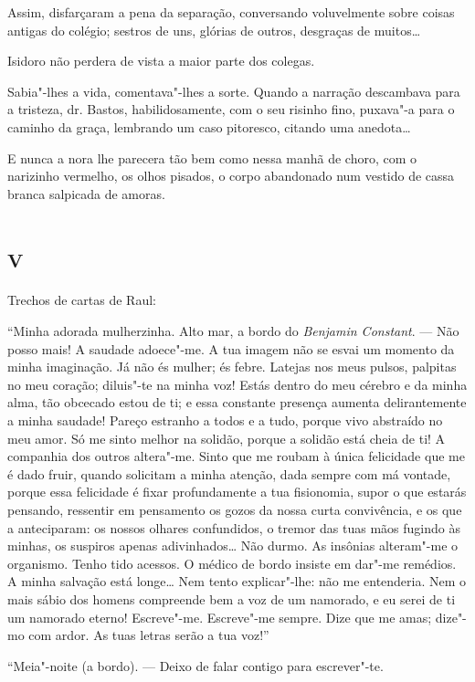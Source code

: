 Assim, disfarçaram a pena da separação, conversando voluvelmente sobre
coisas antigas do colégio; sestros de uns, glórias de outros, desgraças
de muitos\ldots{}

Isidoro não perdera de vista a maior parte dos colegas.

Sabia"-lhes a vida, comentava"-lhes a sorte. Quando a narração descambava
para a tristeza, dr. Bastos, habilidosamente, com o seu risinho fino,
puxava"-a para o caminho da graça, lembrando um caso pitoresco, citando
uma anedota\ldots{}

E nunca a nora lhe parecera tão bem como nessa manhã de choro, com o
narizinho vermelho, os olhos pisados, o corpo abandonado num vestido de
cassa branca salpicada de amoras.

\section*{\textsc{v}}

Trechos de cartas de Raul:

``Minha adorada mulherzinha. Alto mar, a bordo do \emph{Benjamin
Constant}. --- Não posso mais! A saudade adoece"-me. A tua imagem não se
esvai um momento da minha imaginação. Já não és mulher; és febre.
Latejas nos meus pulsos, palpitas no meu coração; diluis"-te na minha
voz! Estás dentro do meu cérebro e da minha alma, tão obcecado estou de
ti; e essa constante presença aumenta delirantemente a minha saudade!
Pareço estranho a todos e a tudo, porque vivo abstraído no meu amor. Só
me sinto melhor na solidão, porque a solidão está cheia de ti! A
companhia dos outros altera"-me. Sinto que me roubam à única felicidade
que me é dado fruir, quando solicitam a minha atenção, dada sempre com
má vontade, porque essa felicidade é fixar profundamente a tua
fisionomia, supor o que estarás pensando, ressentir em pensamento os
gozos da nossa curta convivência, e os que a anteciparam: os nossos
olhares confundidos, o tremor das tuas mãos fugindo às minhas, os
suspiros apenas adivinhados\ldots{} Não durmo. As insônias alteram"-me o
organismo. Tenho tido acessos. O médico de bordo insiste em dar"-me
remédios. A minha salvação está longe\ldots{} Nem tento explicar"-lhe: não me
entenderia. Nem o mais sábio dos homens compreende bem a voz de um
namorado, e eu serei de ti um namorado eterno! Escreve"-me. Escreve"-me
sempre. Dize que me amas; dize"-mo com ardor. As tuas letras serão a tua
voz!''

\dotfill{}

``Meia"-noite (a bordo). --- Deixo de falar contigo para escrever"-te.

